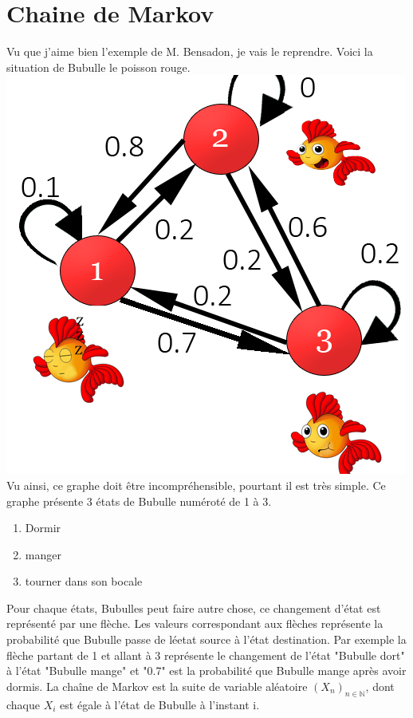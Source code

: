 \documentclass[a4paper]{article}
\begin{document}
\section{Chaine de Markov}

Vu que j'aime bien l'exemple de M. Bensadon, je vais le reprendre. Voici la situation de Bubulle le poisson rouge.
\newline
\noindent
\includegraphics[scale=0.8]{Bubulle le poisson rouge.jpg}
\newline
Vu ainsi, ce graphe doit être incompréhensible, pourtant il est très simple. Ce graphe présente 3 états de Bubulle numéroté de 1 à 3.
\begin{enumerate}
\item Dormir
\item manger
\item tourner dans son bocale
\end{enumerate}
Pour chaque états, Bubulles peut faire autre chose, ce changement d'état est représenté par une flèche. Les valeurs correspondant aux flèches représente la probabilité que Bubulle passe de léetat source à l'état destination. Par exemple la flèche partant de 1 et allant à 3 représente le changement de l'état "Bubulle dort" à l'état "Bubulle mange" et "0.7" est la probabilité que Bubulle mange après avoir dormis.
La chaîne de Markov est la suite de variable aléatoire $(X_n)_{n \in \mathbb{N}}$, dont chaque $X_i$ est égale à l'état de Bubulle à l'instant i. 
\end{document}
